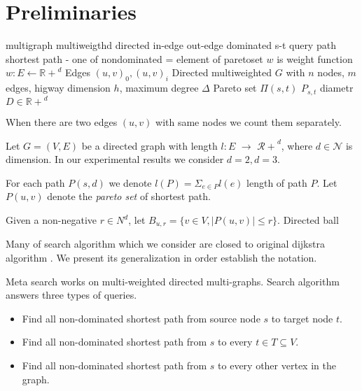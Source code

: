 
\section{Preliminaries}
\label{secPreliminaries}

multigraph 
multiweigthd
directed
in-edge out-edge
dominated
s-t query
path
shortest path - one of nondominated = element of paretoset
$w$ is weight function $w: E \leftarrow \mathbb{R+}^d$
Edges $(u,v)_0,(u,v)_i$
Directed multiweighted $G$ with
$n$ nodes,
$m$ edges, 
higway dimension $h$,
maximum degree $\Delta$
Pareto set $\Pi(s,t)$ $P_{s,t}$
diametr $D \in \mathbb{R+}^d$

When there are two edges $(u,v)$ with same nodes we count them
separately. 


Let $G = (V,E)$ be a directed graph with length
$l: E$ 
$ \rightarrow $
$\mathcal{R+}^d$, 
where $d \in \mathcal{N}$ is
dimension. In our experimental results
we consider $d=2, d=3$.

For each path $P(s,d)$ we denote 
$l(P) = \Sigma_{e\in P} l(e) $
length of path $P$.
Let $P(u,v)$ denote the \emph{pareto set} of shortest path.

Given a non-negative $r \in \mathcal{}{N}^d $, let $B_{u,r} = 
\{ v \in V, |P(u,v)| \le r \} $.
Directed ball



Many of search algorithm which we consider
are closed to original dijkstra algorithm \cite{dijkstra1959note}.
We present its generalization in order establish the notation.

Meta search works on multi-weighted directed multi-graphs. 
Search algorithm answers three types of queries.
\begin{itemize}
\item Find all non-dominated shortest path from source node $s$ to target node $t$.
\item Find all non-dominated shortest path from $s$ to every $t \in T \subseteq V$.
\item Find all non-dominated shortest path from $s$ to every other vertex in the graph.
\end{itemize}


